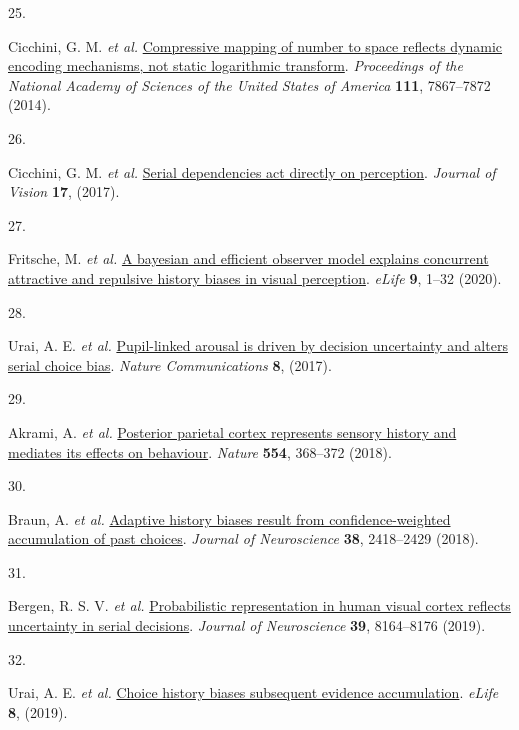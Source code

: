 \documentclass[
]{article}
\newlength{\cslhangindent}
\newlength{\csllabelwidth}
\newlength{\cslentryspacingunit} %
\newenvironment{CSLReferences}[2] %
 {%
  \setlength{\parindent}{0pt}
  \ifodd #1
  \let\oldpar\par
  \def\par{\hangindent=\cslhangindent\oldpar}
  \fi
  \setlength{\parskip}{#2\cslentryspacingunit}
 }%
 {}
\newcommand{\CSLLeftMargin}[1]{\parbox[t]{\csllabelwidth}{#1}}
\newcommand{\CSLRightInline}[1]{\parbox[t]{\linewidth - \csllabelwidth}{#1}\break}
\begin{document}
\begin{CSLReferences}{0}{0}
\leavevmode{}%
\CSLLeftMargin{25. }%
\CSLRightInline{Cicchini, G. M. \emph{et al.}
\href{https://doi.org/10.1073/pnas.1402785111}{Compressive mapping of
number to space reflects dynamic encoding mechanisms, not static
logarithmic transform}. \emph{Proceedings of the National Academy of
Sciences of the United States of America} \textbf{111}, 7867--7872
(2014).}

\leavevmode{}%
\CSLLeftMargin{26. }%
\CSLRightInline{Cicchini, G. M. \emph{et al.}
\href{https://doi.org/10.1167/17.14.6}{Serial dependencies act directly
on perception}. \emph{Journal of Vision} \textbf{17}, (2017).}

\leavevmode{}%
\CSLLeftMargin{27. }%
\CSLRightInline{Fritsche, M. \emph{et al.}
\href{https://doi.org/10.7554/eLife.55389}{A bayesian and efficient
observer model explains concurrent attractive and repulsive history
biases in visual perception}. \emph{eLife} \textbf{9}, 1--32 (2020).}

\leavevmode{}%
\CSLLeftMargin{28. }%
\CSLRightInline{Urai, A. E. \emph{et al.}
\href{https://doi.org/10.1038/ncomms14637}{Pupil-linked arousal is
driven by decision uncertainty and alters serial choice bias}.
\emph{Nature Communications} \textbf{8}, (2017).}

\leavevmode{}%
\CSLLeftMargin{29. }%
\CSLRightInline{Akrami, A. \emph{et al.}
\href{https://doi.org/10.1038/nature25510}{Posterior parietal cortex
represents sensory history and mediates its effects on behaviour}.
\emph{Nature} \textbf{554}, 368--372 (2018).}

\leavevmode{}%
\CSLLeftMargin{30. }%
\CSLRightInline{Braun, A. \emph{et al.}
\href{https://doi.org/10.1523/JNEUROSCI.2189-17.2017}{Adaptive history
biases result from confidence-weighted accumulation of past choices}.
\emph{Journal of Neuroscience} \textbf{38}, 2418--2429 (2018).}

\leavevmode{}%
\CSLLeftMargin{31. }%
\CSLRightInline{Bergen, R. S. V. \emph{et al.}
\href{https://doi.org/10.1523/JNEUROSCI.3212-18.2019}{Probabilistic
representation in human visual cortex reflects uncertainty in serial
decisions}. \emph{Journal of Neuroscience} \textbf{39}, 8164--8176
(2019).}

\leavevmode{}%
\CSLLeftMargin{32. }%
\CSLRightInline{Urai, A. E. \emph{et al.}
\href{https://doi.org/10.7554/eLife.46331}{Choice history biases
subsequent evidence accumulation}. \emph{eLife} \textbf{8}, (2019).}


\end{CSLReferences}
\end{document}
